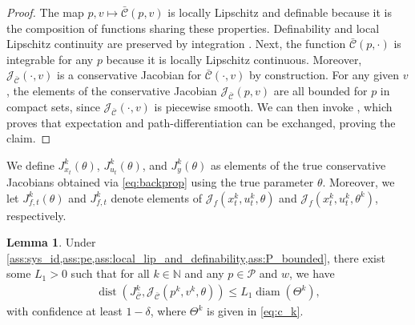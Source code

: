 \documentclass[journal,twoside,web,final]{ieeecolor}
\theoremstyle{definition}
\newtheorem{lemma}{Lemma}
\newcommand{\N}{\mathbb{N}}
\newcommand{\J}{\mathcal{J}}
\newcommand{\Cb}{{\bar{\mathcal{C}}}}
\begin{document}
\begin{proof}
The map $p,v\mapsto\Cb(p,v)$ is locally Lipschitz and definable because it is the composition of functions sharing these properties. 
Definability and local Lipschitz continuity are preserved by integration \cite{speissegger1999pfaffian}. Next, the function $\Cb(p,\cdot)$ is integrable for any $p$ because it is locally Lipschitz continuous. Moreover, $\J_\Cb(\cdot,v)$ is a conservative Jacobian for $\Cb(\cdot,v)$ by construction. For any given $v$, the elements of the conservative Jacobian $\J_\Cb(p,v)$ are all bounded for $p$ in compact sets, since $\J_\Cb(\cdot,v)$ is piecewise smooth. We can then invoke \cite[Theorem 3.10]{bolte2023subgradient}, which proves that expectation and path-differentiation can be exchanged, proving the claim.
\end{proof}
%
We define $J_{x_t}^k(\theta)$, $J_{u_t}^k(\theta)$, and $J_{y}^k(\theta)$ as elements of the true conservative Jacobians obtained via \cref{eq:backprop} using the true parameter $\theta$. Moreover, we let $J_{f,t}^k(\theta)$ and $J_{f,t}^k$ denote elements of $\J_{f}(x_t^k,u_t^k,\theta)$ and $\J_{f}(x_t^k,u_t^k,\theta^k)$, respectively. 
%
\begin{lemma}\label{lemma:bound_gradient}
Under \cref{ass:sys_id,ass:pe,ass:local_lip_and_definability,ass:P_bounded}, there exist some $L_1>0$ such that for all $k\in\N$ and any $p\in \mathcal{P}$ and $w$, we have
\begin{align*}
\operatorname{dist}(J^k_\Cb,\J_\Cb(p^k,v^k,\theta)) \leq L_1 \operatorname*{diam}(\Theta^k),
\end{align*}
with confidence at least $1-\delta$, where $\Theta^k$ is given in \cref{eq:c_k}.
\end{lemma}
%
\end{document}
